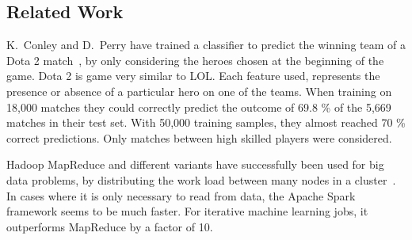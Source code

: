 \subsection{Related Work}\label{sec:relatedwork}

K.\ Conley and D.\ Perry have trained a classifier to predict the winning team of a Dota 2 match~\cite{dota2article}, by only considering the heroes chosen at the beginning of the game. Dota 2 is game very similar to LOL.\@
Each feature used, represents the presence or absence of a particular hero on one of the teams.
When training on 18,000 matches they could correctly predict the outcome of 69.8 \% of the 5,669 matches in their test set.
With 50,000 training samples, they almost reached 70 \% correct predictions. Only matches between high skilled players were considered.



Hadoop MapReduce and different variants have successfully been used for big data problems, by distributing the work load between many nodes in a cluster~\cite{ApacheSpark}.
In cases where it is only necessary to read from data, the Apache Spark framework seems to be much faster.
For iterative machine learning jobs, it outperforms MapReduce by a factor of 10.

